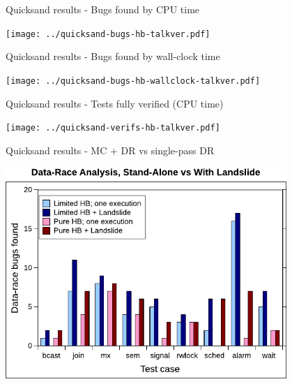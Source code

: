 \documentclass[xcolor=dvipsnames]{beamer}
\begin{document}
\begin{frame}{Quicksand results - Bugs found by CPU time}
	\begin{center}
		\texttt{[image: ../quicksand-bugs-hb-talkver.pdf]}
	\end{center}
\end{frame}
\begin{frame}{Quicksand results - Bugs found by wall-clock time}
	\begin{center}
		\texttt{[image: ../quicksand-bugs-hb-wallclock-talkver.pdf]}
	\end{center}
\end{frame}
\begin{frame}{Quicksand results - Tests fully verified (CPU time)}
	\begin{center}
		\texttt{[image: ../quicksand-verifs-hb-talkver.pdf]}
	\end{center}
\end{frame}
\begin{frame}{Quicksand results - MC + DR vs single-pass DR}
	\begin{center}
		\includegraphics[width=0.8\textwidth]{../../oopsla/dr-false-negatives-poster.pdf}
	\end{center}
\end{frame}
\end{document}
